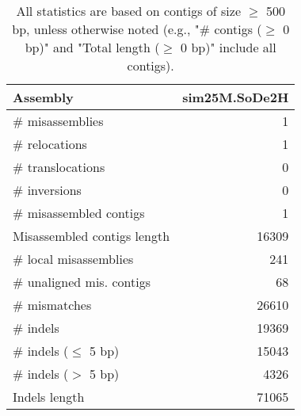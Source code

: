 \documentclass[12pt,a4paper]{article}
\begin{document}
\begin{table}[ht]
\begin{center}
\caption{All statistics are based on contigs of size $\geq$ 500 bp, unless otherwise noted (e.g., "\# contigs ($\geq$ 0 bp)" and "Total length ($\geq$ 0 bp)" include all contigs).}
\begin{tabular}{|l*{1}{|r}|}
\hline
Assembly & sim25M.SoDe2H \\ \hline
\# misassemblies & 1 \\ \hline
\hspace{5mm}\# relocations & 1 \\ \hline
\hspace{5mm}\# translocations & 0 \\ \hline
\hspace{5mm}\# inversions & 0 \\ \hline
\# misassembled contigs & 1 \\ \hline
Misassembled contigs length & 16309 \\ \hline
\# local misassemblies & 241 \\ \hline
\# unaligned mis. contigs & 68 \\ \hline
\# mismatches & 26610 \\ \hline
\# indels & 19369 \\ \hline
\hspace{5mm}\# indels ($\leq$ 5 bp) & 15043 \\ \hline
\hspace{5mm}\# indels ($>$ 5 bp) & 4326 \\ \hline
Indels length & 71065 \\ \hline
\end{tabular}
\end{center}
\end{table}
\end{document}
